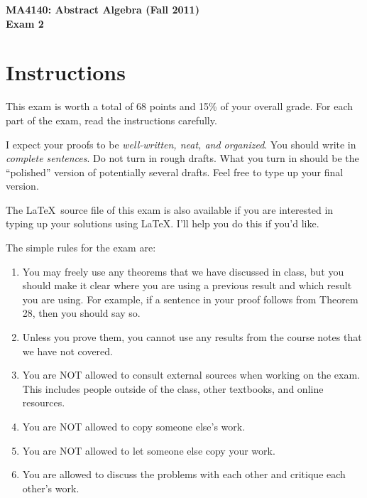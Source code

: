 \documentclass[11pt]{article}
\theoremstyle{definition}
\begin{document}
\begin{center}

{\Large\bf MA4140: Abstract Algebra (Fall 2011)}\\
\smallskip
{\Large\bf Exam 2}

\bigskip

  
  \bigskip
  

\end{center}

\setlength{\fboxsep}{10pt}

\section*{Instructions}

This exam is worth a total of 68 points and 15\% of your overall grade.  For each part of the exam, read the instructions carefully.

\bigskip

I expect your proofs to be \emph{well-written, neat, and organized}.  You should write in \emph{complete sentences}.  Do not turn in rough drafts.  What you turn in should be the ``polished'' version of potentially several drafts.  Feel free to type up your final version.  

\bigskip

The \LaTeX\ source file of this exam is also available if you are interested in typing up your solutions using \LaTeX.  I'll help you do this if you'd like.

\bigskip

The simple rules for the exam are:

\begin{enumerate}
\item You may freely use any theorems that we have discussed in class, but you should make it clear where you are using a previous result and which result you are using.  For example, if a sentence in your proof follows from Theorem 28, then you should say so.
\item Unless you prove them, you cannot use any results from the course notes that we have not covered.
\item You are NOT allowed to consult external sources when working on the exam.  This includes people outside of the class, other textbooks, and online resources.
\item You are NOT allowed to copy someone else's work.
\item You are NOT allowed to let someone else copy your work.
\item You are allowed to discuss the problems with each other and critique each other's work.
\end{enumerate}
\end{document}
